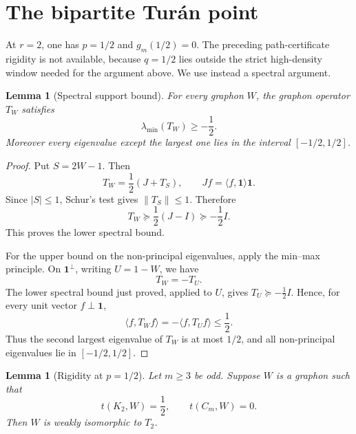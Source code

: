 \documentclass[11pt]{article}
\newtheorem{lemma}[theorem]{Lemma}
\newcommand{\one}{\mathbf 1}
\begin{document}
\section{The bipartite Tur\'an point}

At \(r=2\), one has \(p=1/2\) and \(g_m(1/2)=0\).  The preceding
path-certificate rigidity is not available, because \(q=1/2\) lies outside the
strict high-density window needed for the argument above.  We use instead a
spectral argument.

\begin{lemma}[Spectral support bound]
\label{lem:support}
For every graphon \(W\), the graphon operator \(T_W\) satisfies
\[
        \lambda_{\min}(T_W)\ge -\frac12.
\]
Moreover every eigenvalue except the largest one lies in the interval
\([-1/2,1/2]\).
\end{lemma}

\begin{proof}
Put \(S=2W-1\).  Then
\[
        T_W=\frac12(J+T_S),
        \qquad Jf=\langle f,\one\rangle\one.
\]
Since \(|S|\le1\), Schur's test gives \(\|T_S\|\le1\).  Therefore
\[
        T_W\succeq \frac12(J-I)\succeq -\frac12 I.
\]
This proves the lower spectral bound.

For the upper bound on the non-principal eigenvalues, apply the min--max
principle.  On \(\one^\perp\), writing \(U=1-W\), we have
\[
        T_W=-T_U.
\]
The lower spectral bound just proved, applied to \(U\), gives
\(T_U\succeq -\frac12 I\).  Hence, for every unit vector
\(f\perp\one\),
\[
        \langle f,T_Wf\rangle=-\langle f,T_Uf\rangle\le\frac12.
\]
Thus the second largest eigenvalue of \(T_W\) is at most \(1/2\), and all
non-principal eigenvalues lie in \([-1/2,1/2]\).
\end{proof}

\begin{lemma}[Rigidity at \(p=1/2\)]
\label{lem:bipartite-rigidity}
Let \(m\ge3\) be odd.  Suppose \(W\) is a graphon such that
\[
        t(K_2,W)=\frac12,
        \qquad t(C_m,W)=0.
\]
Then \(W\) is weakly isomorphic to \(T_2\).
\end{lemma}
\end{document}

